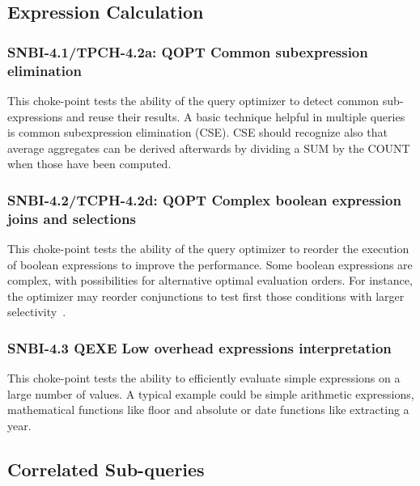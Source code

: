 \subsection{Expression Calculation}

\subsubsection{SNBI-4.1/TPCH-4.2a: QOPT Common subexpression elimination}
\label{choke_point_4.1}
This choke-point tests the ability of the query optimizer to detect common sub-expressions and reuse their results. A basic technique helpful in multiple queries is common subexpression elimination (CSE). 
CSE should recognize also that average aggregates can be derived afterwards by dividing a SUM by the COUNT when those have been computed.

\subsubsection{SNBI-4.2/TCPH-4.2d: QOPT Complex boolean expression joins and selections}
\label{choke_point_4.2}
This choke-point tests the ability of the query optimizer to reorder the execution of boolean expressions to improve the performance. Some boolean expressions are complex, with possibilities for alternative optimal evaluation orders. 
For instance, the optimizer may reorder conjunctions to test first those conditions with larger selectivity~\cite{DBLP:conf/vldb/Moerkotte98}.

\subsubsection{SNBI-4.3 QEXE Low overhead expressions interpretation}
\label{choke_point_4.3}
This choke-point tests the ability to efficiently evaluate simple expressions on a large number of values. A typical example could be simple arithmetic expressions, mathematical functions like floor and absolute or date functions like extracting a year.

\subsection{Correlated Sub-queries}


